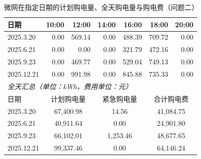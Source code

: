 
\begin{table}[htbp]
  \centering
  \caption{微网在指定日期的计划购电量、全天购电量与购电费（问题二）}
  \label{tab:p2-buy}
  \small
  \begin{tabular}{lrrrrrr}
    \toprule
    日期 & 10:00 & 12:00 & 14:00 & 16:00 & 18:00 & 20:00 \\
    \midrule
    2025.3.20 & 0.00 & 569.14 & 0.00 & 488.39 & 709.72 & 0.00 \\
    2025.6.21 & 0.00 & 0.00 & 0.00 & 321.79 & 472.16 & 0.00 \\
    2025.9.23 & 0.00 & 469.77 & 0.00 & 529.04 & 749.13 & 0.00 \\
    2025.12.21 & 0.00 & 991.98 & 0.00 & 845.88 & 735.33 & 0.00 \\
    \midrule
    \multicolumn{7}{l}{\textit{全天汇总（单位：kWh，费用单位：元）}} \\
    \midrule
    日期 & \multicolumn{2}{c}{计划购电量} & \multicolumn{2}{c}{紧急购电量} & \multicolumn{2}{c}{合计购电费} \\
    \midrule
    2025.3.20 & \multicolumn{2}{c}{67,400.98} & \multicolumn{2}{c}{14.56} & \multicolumn{2}{c}{41,084.75} \\
    2025.6.21 & \multicolumn{2}{c}{40,911.64} & \multicolumn{2}{c}{0.00} & \multicolumn{2}{c}{24,901.80} \\
    2025.9.23 & \multicolumn{2}{c}{66,102.01} & \multicolumn{2}{c}{1,253.46} & \multicolumn{2}{c}{48,677.65} \\
    2025.12.21 & \multicolumn{2}{c}{99,337.46} & \multicolumn{2}{c}{0.00} & \multicolumn{2}{c}{64,146.24} \\
    \bottomrule
  \end{tabular}
\end{table}

